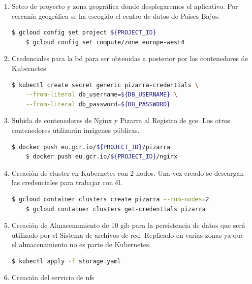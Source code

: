 \documentclass[11pt,spanish,listoffigures,listoftables]{tfgetsinf}
\begin{document}
\begin{enumerate}
	
	\item Seteo de proyecto y zona geográfica donde desplegaremos el aplicativo. Por cercanía geográfica se ha escogido el centro de datos de Países Bajos.
	
	\begin{lstlisting}[language=bash]
	$ gcloud config set project ${PROJECT_ID}
	$ gcloud config set compute/zone europe-west4
	\end{lstlisting}
	
	\item Credenciales para la \acrshort{bd} para ser obtenidas a posterior por los contenedores de Kubernetes
	
	\begin{lstlisting}[language=bash]
	$ kubectl create secret generic pizarra-credentials \
	--from-literal db_username=${DB_USERNAME} \
	--from-literal db_password=${DB_PASSWORD}
	\end{lstlisting}
	
	\item Subida de \Gls{contenedor}es de Nginx y Pizarra al Registro de \acrshort{gce}. Los otros \Gls{contenedor}es utilizarán imágenes públicas.
	
	\begin{lstlisting}[language=bash]	
	$ docker push eu.gcr.io/${PROJECT_ID}/pizarra
	$ docker push eu.gcr.io/${PROJECT_ID}/nginx
	\end{lstlisting}
	
	\item Creación de cluster en Kubernetes con 2 nodos. Una vez creado se descargan las credenciales para trabajar con él.

	\begin{lstlisting}[language=bash]	
	$ gcloud container clusters create pizarra --num-nodes=2
	$ gcloud container clusters get-credentials pizarra
	\end{lstlisting}

	\item Creación de Almacenamiento de 10 \acrshort{gib} para la persistencia de datos que será utilizado por el Sistema de archivos de red. Replicado en varias zonas ya que el almacenamiento no es parte de Kubernetes.
	
	\begin{lstlisting}[language=bash]	
	$ kubectl apply -f storage.yaml
	\end{lstlisting}
	
	\item Creación del servicio de \acrshort{nfs}
	

\end{enumerate}
\end{document}
